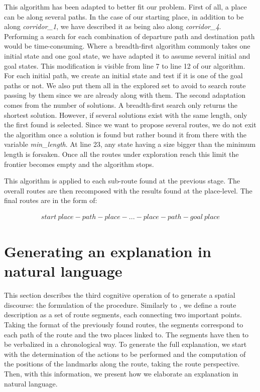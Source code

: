 This algorithm has been adapted to better fit our problem. First of all, a place can be along several paths. In the case of our starting place, in addition to be along \textit{corridor\_1}, we have described it as being also along \textit{corridor\_4}. Performing a search for each combination of departure path and destination path would be time-consuming. Where a breadth-first algorithm commonly takes one initial state and one goal state, we have adapted it to assume several initial and goal states. This modification is visible from line 7 to line 12 of our algorithm. For each initial path, we create an initial state and test if it is one of the goal paths or not. We also put them all in the explored set to avoid to search route passing by them since we are already along with them. The second adaptation comes from the number of solutions. A breadth-first search only returns the shortest solution. However, if several solutions exist with the same length, only the first found is selected. Since we want to propose several routes, we do not exit the algorithm once a solution is found but rather bound it from there with the variable \textit{min\_length}. At line 23, any state having a size bigger than the minimum length is forsaken. Once all the routes under exploration reach this limit the frontier becomes empty and the algorithm stops.

This algorithm is applied to each sub-route found at the previous stage. The overall routes are then recomposed with the results found at the place-level. The final routes are in the form of:

\begin{gather*}
start\ place - path - place - ... - place - path - goal\ place
\end{gather*}

\section{Generating an explanation in natural language}

This section describes the third cognitive operation of \cite{denis_1997_description} to generate a spatial discourse: the formulation of the procedure. Similarly to \cite{cassell_2007_trading}, we define a route description as a set of route segments, each connecting two important points. Taking the format of the previously found routes, the segments correspond to each path of the route and the two places linked to. The segments have then to be verbalized in a chronological way. To generate the full explanation, we start with the determination of the actions to be performed and the computation of the positions of the landmarks along the route, taking the route perspective. Then, with this information, we present how we elaborate an explanation in natural language.

